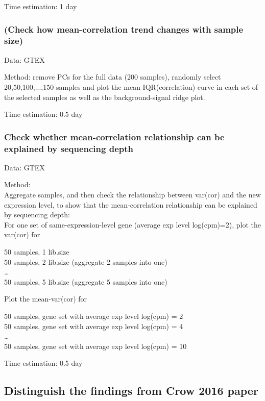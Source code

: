\documentclass[english,letterpaper,pdftex,12pt]{article}
\begin{document}
Time estimation: 1 day

\subsubsection*{(Check how mean-correlation trend changes with sample size)}

Data: GTEX

Method: remove PCs for the full data (200 samples), randomly select 20,50,100,...,150 samples and plot the mean-IQR(correlation) curve in each set of the selected samples as well as the background-signal ridge plot. 

Time estimation: 0.5 day


\subsubsection*{Check whether mean-correlation relationship can be explained by sequencing depth}
Data: GTEX

Method: \\
Aggregate samples, and then check the relationship between var(cor) and the new expression level, to show that the mean-correlation relationship can be explained by sequencing depth: \\
For one set of same-expression-level gene (average exp level log(cpm)=2), plot the var(cor) for 
\begin{center}
    	        50 samples, 1 lib.size\\
				50 samples, 2 lib.size (aggregate 2 samples into one)\\
				…\\
				50 samples, 5 lib.size (aggregate 5 samples into one)\\
\end{center}
			
Plot the mean-var(cor) for 
\begin{center}
				50 samples, gene set with average exp level log(cpm) = 2 \\
				50 samples, gene set with average exp level log(cpm) = 4 \\
				…\\
				50 samples, gene set with average exp level log(cpm) = 10\\
\end{center}

Time estimation: 0.5 day

\subsection*{Distinguish the findings from Crow 2016 paper}
\end{document}
